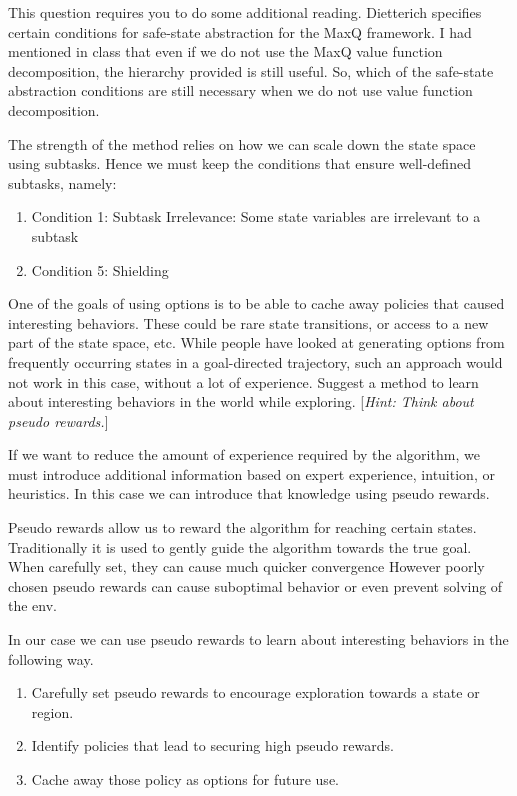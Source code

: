 \documentclass[addpoints,12pt,solution]{exam}
\begin{document}
\begin{questions}
        \question[3] This question requires you to do some additional reading. Dietterich specifies certain conditions for safe-state abstraction for the MaxQ framework. I had mentioned in class that even if we do not use the MaxQ value function decomposition, the hierarchy provided is still useful. So, which of the safe-state abstraction conditions are still necessary when we do not use value function decomposition.
        \begin{solution}
            The strength of the method relies on how we can scale down the state space using subtasks.
            Hence we must keep the conditions that ensure well-defined subtasks, namely:
            \begin{enumerate}
                \item Condition 1: Subtask Irrelevance: Some state variables are irrelevant to a subtask
                \item Condition 5: Shielding
            \end{enumerate}

        \end{solution}

        \question[4] One of the goals of using options is to be able to cache away policies that caused interesting behaviors. These could be rare state transitions, or access to a new part of the state space, etc. While people have looked at generating options from frequently occurring states in a goal-directed trajectory, such an approach would not work in this case, without a lot of experience. Suggest a method to learn about interesting behaviors in the world while exploring. [\textit{Hint: Think about pseudo rewards.}]
        \begin{solution}
            If we want to reduce the amount of experience required by the algorithm, we must introduce additional
            information based on expert experience, intuition, or heuristics. In this case we can introduce that
            knowledge using pseudo rewards.

            Pseudo rewards allow us to reward the algorithm for reaching certain states. Traditionally it is used to
            gently guide the algorithm towards the true goal. When carefully set, they can cause much quicker convergence
            However poorly chosen pseudo rewards can cause suboptimal behavior or even prevent solving of the env.

            In our case we can use pseudo rewards to learn about interesting behaviors in the following way.
            \begin{enumerate}
                \item Carefully set pseudo rewards to encourage exploration towards a state or region.
                \item Identify policies that lead to securing high pseudo rewards.
                \item Cache away those policy as options for future use.
            \end{enumerate}


\end{solution}
\end{questions}
\end{document}
